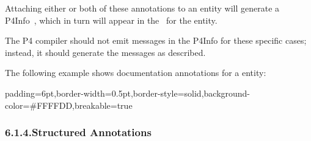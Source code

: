\documentclass[11pt]{article}
\begin{document}
{%
\noindent{}Attaching either or both of these annotations to an entity will generate a
P4Info~, which in turn will
appear in the~ for the entity.%

The P4 compiler should not emit  messages in the P4Info for these
specific cases; instead, it should generate the  messages as
described.%

The following example shows documentation annotations for a  entity:%

\begin{mdbmargintb}{6pt}{6pt}%
\begin{mdblock}{padding=6pt,border-width=0.5pt,border-style=solid,background-color=\#FFFFDD,breakable=true}%
\begin{mdpre}%
\end{mdpre}%
\end{mdblock}%
\end{mdbmargintb}%

\subsubsection{6.1.4.\hspace*{0.5em}Structured Annotations}\label{sec-structured-annotations}%

}
\end{document}
